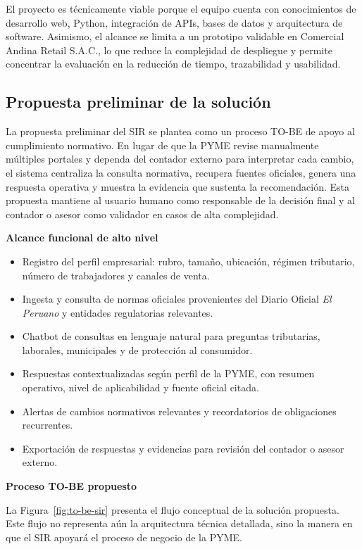 \documentclass[12pt,a4paper,oneside]{report}
\begin{document}
El proyecto es técnicamente viable porque el equipo cuenta con conocimientos de desarrollo web, Python, integración de APIs, bases de datos y arquitectura de software. Asimismo, el alcance se limita a un prototipo validable en Comercial Andina Retail S.A.C., lo que reduce la complejidad de despliegue y permite concentrar la evaluación en la reducción de tiempo, trazabilidad y usabilidad.

\subsection{Propuesta preliminar de la solución}\label{subsec:propuesta-preliminar-solucion}

La propuesta preliminar del SIR se plantea como un proceso TO-BE de apoyo al cumplimiento normativo. En lugar de que la PYME revise manualmente múltiples portales y dependa del contador externo para interpretar cada cambio, el sistema centraliza la consulta normativa, recupera fuentes oficiales, genera una respuesta operativa y muestra la evidencia que sustenta la recomendación. Esta propuesta mantiene al usuario humano como responsable de la decisión final y al contador o asesor como validador en casos de alta complejidad.

\textbf{Alcance funcional de alto nivel}

\begin{itemize}
\item Registro del perfil empresarial: rubro, tamaño, ubicación, régimen tributario, número de trabajadores y canales de venta.
\item Ingesta y consulta de normas oficiales provenientes del Diario Oficial \textit{El Peruano} y entidades regulatorias relevantes.
\item Chatbot de consultas en lenguaje natural para preguntas tributarias, laborales, municipales y de protección al consumidor.
\item Respuestas contextualizadas según perfil de la PYME, con resumen operativo, nivel de aplicabilidad y fuente oficial citada.
\item Alertas de cambios normativos relevantes y recordatorios de obligaciones recurrentes.
\item Exportación de respuestas y evidencias para revisión del contador o asesor externo.
\end{itemize}

\textbf{Proceso TO-BE propuesto}

La Figura~\ref{fig:to-be-sir} presenta el flujo conceptual de la solución propuesta. Este flujo no representa aún la arquitectura técnica detallada, sino la manera en que el SIR apoyará el proceso de negocio de la PYME.
\end{document}
